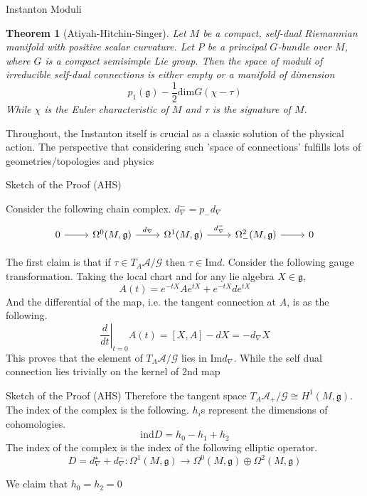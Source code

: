 \documentclass[10pt]{beamer}
\newtheorem{thm}{Theorem}
\begin{document}
\begin{frame}{Instanton Moduli}

    \begin{thm}[Atiyah-Hitchin-Singer]
        Let $M$ be a compact, self-dual Riemannian manifold with positive scalar curvature. Let $P$ be a principal $G$-bundle over $M$, where $G$ is a compact semisimple Lie group. Then the space of moduli of irreducible self-dual connections is either empty or a manifold of dimension 
        \[
            p_1(\mathfrak{g})-\frac{1}{2}\mathrm{dim}G(\chi-\tau)
        \]
        While $\chi$ is the Euler characteristic of $M$ and $\tau$ is the signature of $M$. 
    \end{thm}

    Throughout, the Instanton itself is crucial as a classic solution of the physical action. The perspective that considering such 'space of connections' fulfills lots of geometries/topologies and physics
\end{frame}



\begin{frame}[fragile]{Sketch of the Proof (AHS)}

    Consider the following chain complex. $d_\nabla^- = p_-d_\nabla$
    \[
        \begin{tikzcd}
        0 \arrow[r] & \Omega^0(M, \mathfrak{g}) \arrow[r, "d_\nabla"] & \Omega^1(M, \mathfrak{g}) \arrow[r, "d_\nabla^{-}"] & \Omega^2_{-}(M, \mathfrak{g}) \arrow[r] & 0
        \end{tikzcd}
    \]

    The first claim is that if $\tau \in T_A\mathscr{A}/\mathscr{G}$ then $\tau\in\mathrm{Im}d$. Consider the following gauge transformation. Taking the local chart and for any lie algebra $X\in\mathfrak{g}$, 
    \[
        A(t) = e^{-tX}A e^{tX} + e^{-tX}d e^{tX}
    \]
    And the differential of the map, i.e. the tangent connection at $A$, is as the following.
    \[
        \left.\frac{d}{dt}\right|_{t=0}A(t)= [X,A] - dX = -d_\nabla X
    \]
    This proves that the element of $T_A\mathscr{A}/\mathscr{G}$ lies in $\mathrm{Im}d_\nabla$. While the self dual connection lies trivially on the kernel of 2nd map
 
\end{frame}

\begin{frame}{Sketch of the Proof (AHS)}
    Therefore the tangent space $T_A\mathscr{A}_+/\mathscr{G}\cong H^1(M,\mathfrak{g})$. The index of the complex is the following. $h_i$s represent the dimensions of cohomologies.
    \[
        \mathrm{ind}D = h_0-h_1+h_2
    \]
    The index of the complex is the index of the following elliptic operator.
    \[
        D=d_\nabla^\star + d_\nabla^-: \Omega^1(M,\mathfrak{g})\rightarrow \Omega^0(M,\mathfrak{g}) \oplus \Omega^2(M,\mathfrak{g})
    \]

    We claim that $h_0=h_2=0$
\end{frame}
\end{document}
